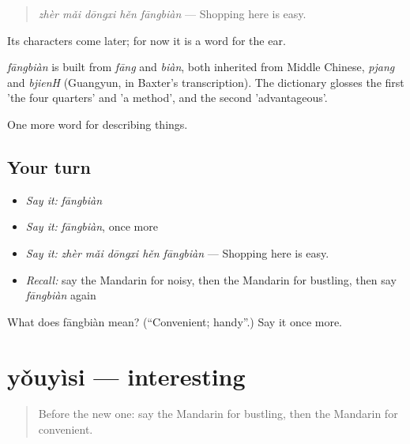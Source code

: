 \begin{quote}
\emph{zhèr mǎi dōngxi hěn fāngbiàn} — Shopping here is easy.
\end{quote}

Its characters come later; for now it is a word for the ear.

\begin{cousinweb}
\emph{fāngbiàn} is built from \emph{fāng} and \emph{biàn}, both inherited from Middle Chinese, \emph{pjang} and \emph{bjienH} (Guangyun, in Baxter's transcription). The dictionary glosses the first 'the four quarters' and 'a method', and the second 'advantageous'.
\end{cousinweb}

\begin{grammarlens}[title={What you've built}]
One more word for describing things.
\end{grammarlens}

\subsection*{Your turn}
\begin{itemize}
\raggedright
  \item \emph{Say it:} \emph{fāngbiàn}
  \item \emph{Say it:} \emph{fāngbiàn}, once more
  \item \emph{Say it:} \emph{zhèr mǎi dōngxi hěn fāngbiàn} — Shopping here is easy.
  \item \emph{Recall:} say the Mandarin for noisy, then the Mandarin for bustling, then say \emph{fāngbiàn} again
\end{itemize}

\begin{tcolorbox}[breakable,colback=teal!4,colframe=teal!35!black,title={Before you move on}]
What does fāngbiàn mean? (\textquotedblleft{}Convenient; handy\textquotedblright{}.) Say it once more.
\end{tcolorbox}
\section[yǒuyìsi]{yǒuyìsi — interesting}

\label{lesson:ZH-C129-youyisi}



\begin{quote}
Before the new one: say the Mandarin for bustling, then the Mandarin for convenient.
\end{quote}

